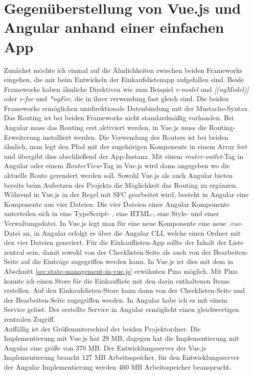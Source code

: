 \section{Gegenüberstellung von Vue.js und Angular anhand einer einfachen App}
Zunächst möchte ich einmal auf die Ähnlichkeiten zwischen beiden Frameworks eingehen, die mir beim Entwickeln der Einkaufslistenapp aufgefallen sind.
Beide Frameworks haben ähnliche Direktiven wie zum Beispiel \emph{v-model} und \emph{[(ngModel)]} oder \emph{v-for} und \emph{*ngFor},
die in ihrer verwendung fast gleich sind.
Die beiden Frameworks ermöglichen unidirektionale Datenbindung mit der Mustache-Syntax.
Das Routing ist bei beiden Frameworks nicht standardmäßig vorhanden.
Bei Angular muss das Routing erst aktiviert werden, in Vue.js muss die Routing-Erweiterung installiert werden.
Die Verwendung des Routers ist bei beiden ähnlich, man legt den Pfad mit der zugehörigen Komponente in einem Array fest
und übergibt dies abschließend der App-Instanz.
Mit einem \emph{router-outlet}-Tag in Angular oder einem \emph{RouterView}-Tag in Vue.js wird dann angegeben wo die aktuelle Route gerendert werden soll.
Sowohl Vue.js als auch Angular bieten bereits beim Aufsetzen des Projekts die Möglichkeit das Routing zu ergänzen.
Während in Vue.js in der Regel mit SFC gearbeitet wird, besteht in Angular eine Komponente aus vier Dateien.
Die vier Dateien einer Angular Komponente unterteilen sich in eine TypeScript- , eine HTML-, eine Style- und einer Verwaltungsdatei.
In Vue.js legt man für eine neue Komponente eine neue \emph{.vue}-Datei an,
in Angular erfolgt es über die Angular CLI, welche einen Ordner mit den vier Dateien generiert.
Für die Einkauflisten-App sollte der Inhalt der Liste zentral sein, damit sowohl von der Checklisten-Seite als auch von der Bearbeiten-Seite
auf die Einträge zugegriffen werden kann.
In Vue.js ist dies mit dem in Abschnitt \ref{sec:state-management-in-vue.js} erwähnten Pina möglich.
Mit Pina konnte ich einen Store für die Einkaufliste mit den darin enthaltenen Items erstellen.
Auf den Einkaufslisten-Store kann dann von der Checklisten-Seite und der Bearbeiten-Seite zugegriffen werden.
In Angular habe ich es mit einem Service gelöst.
Der erstellte Service in Angular ermöglicht einen gleichwertigen zentralen Zugriff.
\\
Auffällig ist der Größenunterschied der beiden Projektordner.
Die Implementierung mit Vue.js hat 29 MB, dagegen hat die Implementierung mit Angular eine größe von 370 MB.
Der Entwicklungsserver der Vue.js Implementierung braucht 127 MB Arbeitsspeicher, für den Entwicklungsserver der Angular Implementierung
werden 460 MB Arbeitsspeicher beansprucht.




